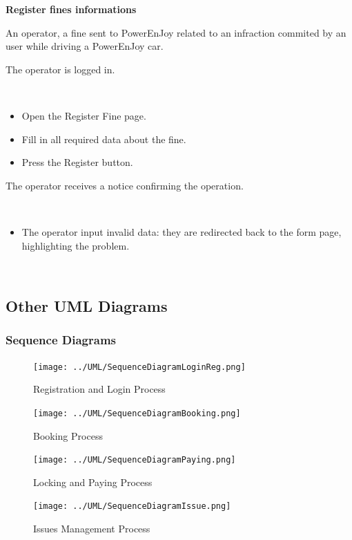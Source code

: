 \documentclass[11pt]{article} %
\newcommand{\pe}{PowerEnJoy }
\begin{document}
\begin{description}[noitemsep,topsep=0pt,parsep=0pt,partopsep=0pt]
	\item[Name:] \textbf{Register fines informations}
	\item[Actors Involved:] An operator, a fine sent to \pe related to an infraction commited by an user while driving a \pe car.
	\item[Entry Conditions:] The operator is logged in.
	\item[Flow Of Events:] \hfill\
	\begin{itemize}
		\item Open the Register Fine page.
		\item Fill in all required data about the fine.
		\item Press the Register button.
	\end{itemize}
	\item[Exit conditions:]  The operator receives a notice confirming the operation.
	\item[Exceptions:] \hfill\
	\begin{itemize}
		\item The operator input invalid data: they are redirected back to the form page, highlighting the problem.
	\end{itemize}
\end{description}
\hfill\

\subsection{Other UML Diagrams}

\subsubsection{Sequence Diagrams}
\begin{figure}[H]
	\centering
	\texttt{[image: ../UML/SequenceDiagramLoginReg.png]}
	\caption{Registration and Login Process}
\end{figure}
\begin{figure}[H]
	\centering
	\texttt{[image: ../UML/SequenceDiagramBooking.png]}
	\caption{Booking Process}
\end{figure}
\begin{figure}[H]
	\centering
	\texttt{[image: ../UML/SequenceDiagramPaying.png]}
	\caption{Locking and Paying Process}
\end{figure}
\begin{figure}[H]
	\centering
	\texttt{[image: ../UML/SequenceDiagramIssue.png]}
	\caption{Issues Management Process}
\end{figure}
\end{document}
